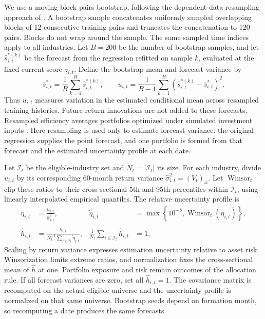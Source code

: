 We use a moving-block pairs bootstrap, following the dependent-data resampling approach of \citet{kunsch1989}. A bootstrap sample concatenates uniformly sampled overlapping blocks of 12 consecutive training pairs and truncates the concatenation to 120 pairs. Blocks do not wrap around the sample. The same sampled time indices apply to all industries. Let $B=200$ be the number of bootstrap samples, and let $\widehat s_{i,t}^{*(k)}$ be the forecast from the regression refitted on sample $k$, evaluated at the fixed current score $z_{i,t}$. Define the bootstrap mean and forecast variance by
\begin{equation}
\overline s_{i,t}^{*}=\frac{1}{B}\sum_{k=1}^{B}\widehat s_{i,t}^{*(k)},
\qquad
u_{i,t}=\frac{1}{B-1}\sum_{k=1}^{B}
\left(\widehat s_{i,t}^{*(k)}-\overline s_{i,t}^{*}\right)^2.
\label{eq:bootstrap-variance}
\end{equation}
Thus $u_{i,t}$ measures variation in the estimated conditional mean across resampled training histories. Future return innovations are not added to these forecasts. Resampled efficiency averages portfolios optimized under simulated investment inputs \citep[Chapter~6]{michaud2008}. Here resampling is used only to estimate forecast variance: the original regression supplies the point forecast, and one portfolio is formed from that forecast and the estimated uncertainty profile at each date.

Let $\mathcal I_t$ be the eligible-industry set and $N_t=|\mathcal I_t|$ its size. For each industry, divide $u_{i,t}$ by its corresponding 60-month return variance $\widehat\sigma_{i,t}^2=(V_t)_{ii}$. Let $\operatorname{Winsor}_t$ clip these ratios to their cross-sectional 5th and 95th percentiles within $\mathcal I_t$, using linearly interpolated empirical quantiles. The relative uncertainty profile is
\begin{equation}
\begin{aligned}
\eta_{i,t}&=\frac{u_{i,t}}{\widehat\sigma_{i,t}^{2}},
&\widetilde\eta_{i,t}&=\max\left\{10^{-8},\operatorname{Winsor}_t(\eta_{i,t})\right\},\\
\widehat h_{i,t}&=\frac{\widetilde\eta_{i,t}}
{N_t^{-1}\sum_{j\in\mathcal I_t}\widetilde\eta_{j,t}},
&\frac{1}{N_t}\sum_{i\in\mathcal I_t}\widehat h_{i,t}&=1.
\end{aligned}
\label{eq:relative-uncertainty}
\end{equation}
Scaling by return variance expresses estimation uncertainty relative to asset risk. Winsorization limits extreme ratios, and normalization fixes the cross-sectional mean of $\widehat h$ at one. Portfolio exposure and risk remain outcomes of the allocation rule. If all forecast variances are zero, set all $\widehat h_{i,t}=1$. The covariance matrix is recomputed on the actual eligible universe and the uncertainty profile is normalized on that same universe. Bootstrap seeds depend on formation month, so recomputing a date produces the same forecasts.


